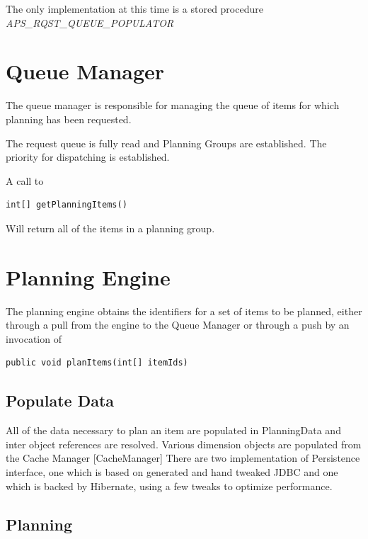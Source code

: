 \documentclass[letterpaper,10pt,english]{sphinxmanual}
\begin{document}
The only implementation at this time is a stored procedure
\emph{APS\_RQST\_QUEUE\_POPULATOR}


\section{Queue Manager}
\label{APS/Technical:queue-manager}
The queue manager is responsible for managing the queue of items for
which planning has been requested.

The request queue is fully read and Planning Groups are established. The
priority for dispatching is established.

A call to

\begin{Verbatim}[commandchars=\\\{\}]
int[] getPlanningItems()
\end{Verbatim}

Will return all of the items in a planning group.


\section{Planning Engine}
\label{APS/Technical:planning-engine}
The planning engine obtains the identifiers for a set of items to be
planned, either through a pull from the engine to the Queue Manager or
through a push by an invocation of

\begin{Verbatim}[commandchars=\\\{\}]
public void planItems(int[] itemIds)
\end{Verbatim}


\subsection{Populate Data}
\label{APS/Technical:populate-data}
All of the data necessary to plan an item are populated in PlanningData
and inter object references are resolved. Various dimension objects are
populated from the Cache Manager {[}CacheManager{]} There are two
implementation of Persistence interface, one which is based on generated
and hand tweaked JDBC and one which is backed by Hibernate, using a few
tweaks to optimize performance.


\subsection{Planning}
\label{APS/Technical:planning}
\end{document}
